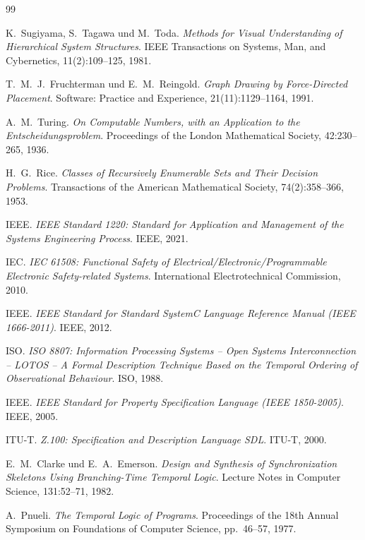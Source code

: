 ﻿\documentclass[a4paper,12pt]{report}
\theoremstyle{definition}
\begin{document}
\begin{thebibliography}{99}

K.~Sugiyama, S.~Tagawa und M.~Toda.
\textit{Methods for Visual Understanding of Hierarchical System Structures}.
IEEE Transactions on Systems, Man, and Cybernetics, 11(2):109--125, 1981.

T.~M.~J.~Fruchterman und E.~M.~Reingold.
\textit{Graph Drawing by Force-Directed Placement}.
Software: Practice and Experience, 21(11):1129--1164, 1991.

A.~M.~Turing.
\textit{On Computable Numbers, with an Application to the Entscheidungsproblem}.
Proceedings of the London Mathematical Society, 42:230--265, 1936.

H.~G.~Rice.
\textit{Classes of Recursively Enumerable Sets and Their Decision Problems}.
Transactions of the American Mathematical Society, 74(2):358--366, 1953.

IEEE.
\textit{IEEE Standard 1220: Standard for Application and Management of the
Systems Engineering Process}.
IEEE, 2021.

IEC.
\textit{IEC 61508: Functional Safety of Electrical/Electronic/Programmable Electronic
Safety-related Systems}.
International Electrotechnical Commission, 2010.

IEEE.
\textit{IEEE Standard for Standard SystemC Language Reference Manual (IEEE 1666-2011)}.
IEEE, 2012.

ISO.
\textit{ISO 8807: Information Processing Systems -- Open Systems Interconnection --
LOTOS -- A Formal Description Technique Based on the Temporal Ordering of
Observational Behaviour}.
ISO, 1988.

IEEE.
\textit{IEEE Standard for Property Specification Language (IEEE 1850-2005)}.
IEEE, 2005.

ITU-T.
\textit{Z.100: Specification and Description Language SDL}.
ITU-T, 2000.

E.~M.~Clarke und E.~A.~Emerson.
\textit{Design and Synthesis of Synchronization Skeletons Using Branching-Time
Temporal Logic}.
Lecture Notes in Computer Science, 131:52--71, 1982.

A.~Pnueli.
\textit{The Temporal Logic of Programs}.
Proceedings of the 18th Annual Symposium on Foundations of Computer Science,
pp.~46--57, 1977.


\end{thebibliography}
\end{document}
